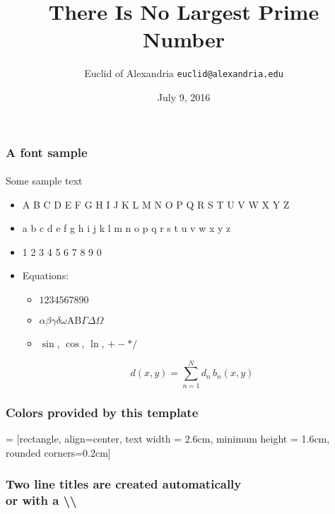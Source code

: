 \documentclass{beamer}
\title{There Is No Largest Prime Number}
\date{July 9, 2016}
\author{Euclid of Alexandria \texttt{euclid@alexandria.edu}}
\begin{document}
\insertTitleSlide

\begin{frame}
	\titlepage
\end{frame}


\begin{frame} 
\frametitle{A font sample} 
\framesubtitle{\printcurrentfont} 

Some sample text
\begin{itemize}
	\item A B C D E F G H I J K L M N O P Q R S T U V W X Y Z
	\item a b c d e f g h i j k l m n o p q r s t u v w x y z
	\item 1 2 3 4 5 6 7 8 9 0
	\item Equations:
	\begin{itemize}
		\item $1 2 3 4 5 6 7 8 9 0$
		\item $\alpha \beta \gamma \delta \omega \text{A} \text{B} \Gamma \Delta \Omega$
		\item $\sin$, $\cos$, $\ln$, $+ - * /$
	\end{itemize}
	
	\begin{equation}
		d\left( x, y \right) = \sum_{n=1}^N d_n \, b_n \left( x, y \right)
	\end{equation}
\end{itemize}

\end{frame}



\begin{frame}[fragile]
\frametitle{Colors provided by this template}
\centering
{} = [rectangle,
                               align=center, 
                               text width = 2.6cm,
                               minimum height = 1.6cm,
                               rounded corners=0.2cm]
                               
\newcommand{\colorSampleNode}[2]{
    \node[colorSampleNodeTemplate, fill=#1, text=#2] 
        {#1\\\HTMLcolor{#1}};
        }


\end{frame}



\begin{frame} 
\frametitle{Two line titles are created automatically\\or with a \textbackslash\textbackslash}  
\lipsum[1]
\end{frame}


\insertLastSlide
\end{document}

